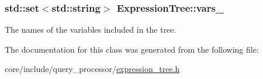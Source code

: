 \subsubsection[{vars\+\_\+}]{\setlength{\rightskip}{0pt plus 5cm}std\+::set$<$std\+::string$>$ Expression\+Tree\+::vars\+\_\+\hspace{0.3cm}{\ttfamily [private]}}\label{classExpressionTree_aa396f95ec3ecb764d9d0b0598c749964}
The names of the variables included in the tree. 

The documentation for this class was generated from the following file\+:\begin{DoxyCompactItemize}
\item 
core/include/query\+\_\+processor/\hyperlink{expression__tree_8h}{expression\+\_\+tree.\+h}\end{DoxyCompactItemize}
